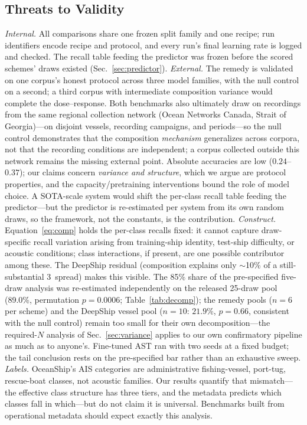 ﻿\documentclass[journal]{IEEEtran}
\newcommand{\pp}{\,\text{pp}}
\begin{document}
\subsection{Threats to Validity}
\label{sec:threats}
\emph{Internal.} All comparisons share one frozen split family and one recipe; run identifiers
encode recipe and protocol, and every run's final learning rate is logged and checked. The recall
table feeding the predictor was frozen before the scored schemes' draws existed
(Sec.~\ref{sec:predictor}). \emph{External.} The remedy is validated on one corpus's honest protocol across three
model families, with the null control on a second; a third corpus with intermediate composition
variance would complete the dose--response. Both benchmarks also ultimately draw on recordings
from the same regional collection network (Ocean Networks Canada, Strait of Georgia)---on disjoint vessels, recording campaigns, and periods---so the null control demonstrates that the
composition \emph{mechanism} generalizes across corpora, not that the recording conditions are
independent; a corpus collected outside this network remains the missing external point.
Absolute accuracies are low ($0.24$--$0.37$); our
claims concern \emph{variance and structure}, which we argue are protocol properties, and the
capacity/pretraining interventions bound the role of model choice. A SOTA-scale system would shift
the per-class recall table feeding the predictor---but the predictor is re-estimated per system
from its own random draws, so the framework, not the constants, is the contribution.
\emph{Construct.} Equation~\eqref{eq:comp} holds the per-class recalls fixed: it cannot capture
draw-specific recall variation arising from training-ship identity, test-ship difficulty, or
acoustic conditions; class interactions, if present, are one possible contributor among these.
The DeepShip residual (composition explains only $\sim$10\% of a
still-substantial 3\pp{} spread) makes this visible. The 85\% share of the pre-specified five-draw
analysis was re-estimated independently on the released 25-draw pool (89.0\%, permutation
$p=0.0006$; Table~\ref{tab:decomp}); the remedy pools ($n{=}6$ per scheme) and the DeepShip
vessel pool ($n{=}10$: $21.9\%$, $p=0.66$, consistent with the null control) remain too small for
their own decomposition---the required-$N$ analysis of Sec.~\ref{sec:variance} applies to our own
confirmatory pipeline as much as to anyone's. Fine-tuned AST ran with two seeds at a fixed
budget; the tail conclusion rests on the pre-specified bar rather than an exhaustive sweep.
\emph{Labels.} OceanShip's AIS categories are administrative fishing-vessel, port-tug,
rescue-boat classes, not acoustic families. Our results quantify that mismatch---the effective
class structure has three tiers, and the metadata predicts which classes
fall in which---but do not claim it is universal. Benchmarks built from operational metadata
should expect exactly this analysis.
\end{document}
